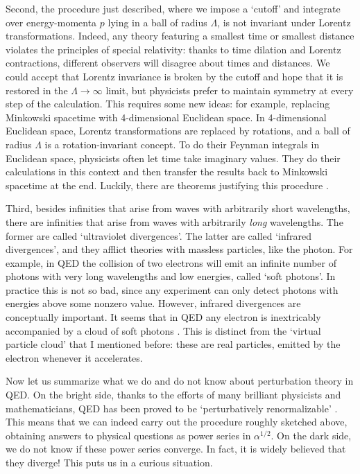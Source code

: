 \documentclass{article}
\begin{document}
Second, the procedure just described, where we impose a `cutoff' and integrate over energy-momenta $p$ lying in a ball of radius $\Lambda$, is not invariant under Lorentz transformations.   Indeed, any theory featuring a smallest time or smallest distance violates the principles of special relativity: thanks to time dilation and Lorentz contractions, different observers will disagree about times and distances.  We could accept that Lorentz invariance is broken by the cutoff and hope that it is restored in the $\Lambda \to \infty$ limit, but physicists prefer to maintain symmetry at every step of the calculation.  This requires some new ideas: for example, replacing Minkowski spacetime with 4-dimensional Euclidean space.  In 4-dimensional Euclidean space, Lorentz transformations are replaced by rotations, and a ball of radius $\Lambda$ is a rotation-invariant concept.   To do their Feynman integrals in Euclidean space, physicists often let time take imaginary values.  They do their calculations in this context and then transfer the results back to Minkowski spacetime at the end.   Luckily, there are theorems justifying this procedure \cite{GlimmJaffe, Haag, StreaterWightman}.

Third, besides infinities that arise from waves with arbitrarily short wavelengths, there are infinities that arise from waves with arbitrarily \emph{long} wavelengths.   The former are called `ultraviolet divergences'.  The latter are called `infrared divergences', and they afflict theories with massless particles, like the photon.  For example, in QED the collision of two electrons will emit an infinite number of photons with very long wavelengths and low energies, called `soft photons'.  In practice this is not so bad, since any experiment can only detect photons with energies above some nonzero value.   However, infrared divergences are conceptually important.  It seems that in QED any electron is inextricably accompanied by a cloud of soft photons \cite{Buchholz}.   This is distinct from the `virtual particle cloud' that I mentioned before: these are real particles, emitted by the electron whenever it accelerates.

Now let us summarize what we do and do not know about perturbation theory in QED.  On the bright side, thanks to the efforts of many brilliant physicists and mathematicians, QED has been proved to be `perturbatively renormalizable' \cite{FHRW,Scharf}.  This means that we can indeed carry out the procedure roughly sketched above, obtaining answers to physical questions as power series in $\alpha^{1/2}$.  On the dark side, we do not know if these power series converge.   In fact, it is widely believed that they diverge!   This puts us in a curious situation.  
\end{document}
